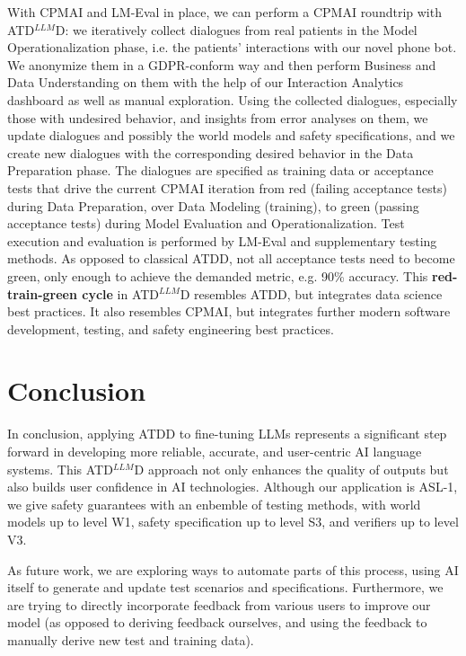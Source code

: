 \documentclass[twocolumn]{article}
\newcommand{\ATDLLMD}{ATD$^{LLM}$D}%
\begin{document}
With CPMAI and LM-Eval in place, we can perform a CPMAI roundtrip with \ATDLLMD{}:
we iteratively collect dialogues from real patients in the Model Operationalization phase,
i.e. the patients’ interactions with our novel phone bot.
We anonymize them in a GDPR-conform way and then perform Business and Data Understanding on them
with the help of our Interaction Analytics dashboard as well as manual exploration.
Using the collected dialogues, especially those with undesired behavior, and insights from error analyses on them,
we update dialogues and possibly the world models and safety specifications,
and we create new dialogues with the corresponding desired behavior in the Data Preparation phase.
The dialogues are specified as training data or acceptance tests that drive the current CPMAI iteration
from red (failing acceptance tests) during Data Preparation,
over Data Modeling (training), to green (passing acceptance tests) during Model Evaluation and Operationalization.
Test execution and evaluation is performed by LM-Eval and supplementary testing methods.
As opposed to classical ATDD, not all acceptance tests need to become green, only enough to achieve the demanded metric, e.g. 90\% accuracy.
This {\bfseries red-train-green cycle} in \ATDLLMD{} resembles ATDD, but integrates data science best practices.
It also resembles CPMAI, but integrates further modern software development, testing, and safety engineering best practices.


\section{Conclusion}

In conclusion, applying ATDD to fine-tuning LLMs represents a significant step forward in developing more reliable, accurate, and user-centric AI language systems. This \ATDLLMD{} approach not only enhances the quality of outputs but also builds user confidence in AI technologies.
Although our application is ASL-1, we give safety guarantees with an enbemble of testing methods, with world models up to level W1, safety specification up to level S3, and verifiers up to level V3.

As future work, we are exploring ways to automate parts of this process, using AI itself to generate and update test scenarios and specifications.
Furthermore, we are trying to directly incorporate feedback from various users to improve our model (as opposed to deriving feedback ourselves, and using the feedback to manually derive new test and training data).
\end{document}
